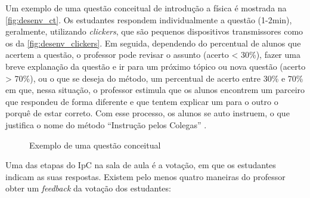 Um exemplo de uma questão conceitual de introdução a física é mostrada na \autoref{fig:desenv_ct}. Os
estudantes respondem individualmente  a questão (1-2min), geralmente, utilizando
\textit{clickers}, que são pequenos dispositivos transmissores como os da \autoref{fig:desenv_clickers}.
Em seguida, dependendo do percentual de alunos que acertem a questão,
o professor pode revisar o assunto (acerto < 30\%), fazer uma breve explanação da
questão e ir para um próximo tópico ou nova questão (acerto > 70\%), ou o que se
deseja do método, um percentual de acerto entre 30\% e 70\% em que, nessa situação, o
professor estimula que os alunos encontrem um parceiro que respondeu de forma diferente
e que tentem explicar um para o outro o porquê de estar correto. Com esse processo, os alunos se auto
instruem, o que justifica o nome do método ``Instrução pelos Colegas'' \cite{Mazur2009, Crouch2001}.


\begin{figure}[t]
  \centering
  \caption{Exemplo de uma questão conceitual}
\end{figure}

Uma das etapas do IpC na sala de aula é a votação, em que os estudantes indicam
as suas respostas. Existem pelo menos quatro maneiras \cite{Crouch2007} do professor
obter um \textit{feedback} da votação dos estudantes:

